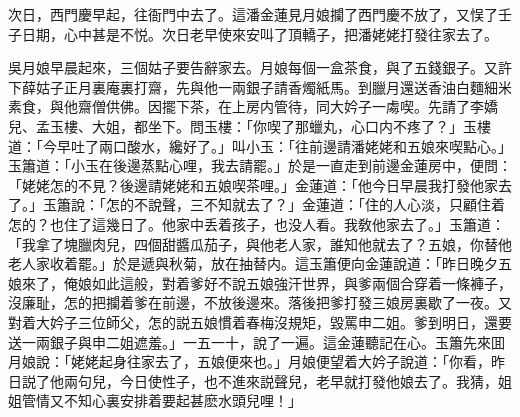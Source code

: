 次日，西門慶早起，往衙門中去了。這潘金蓮見月娘攔了西門慶不放了，又悮了壬子日期，心中甚是不悦。次日老早使來安叫了頂轎子，把潘姥姥打發往家去了。

吳月娘早晨起來，三個姑子要告辭家去。月娘每個一盒茶食，與了五錢銀子。又許下薛姑子正月裏庵裏打齋，先與他一兩銀子請香燭紙馬。到臘月還送香油白麵細米素食，與他齋僧供佛。因擺下茶，在上房内管待，同大妗子一䖏喫。先請了李嬌兒、孟玉樓、大姐，都坐下。問玉樓：「你喫了那蠟丸，心口内不疼了？」玉樓道：「今早吐了兩口酸水，纔好了。」叫小玉：「往前邊請潘姥姥和五娘來喫點心。」玉簫道：「小玉在後邊蒸點心哩，我去請罷。」於是一直走到前邊金蓮房中，便問：「姥姥怎的不見？後邊請姥姥和五娘喫茶哩。」金蓮道：「他今日早晨我打發他家去了。」玉簫說：「怎的不說聲，三不知就去了？」金蓮道：「住的人心淡，只顧住着怎的？也住了這幾日了。他家中丢着孩子，也没人看。我敎他家去了。」玉簫道：「我拿了塊臘肉兒，四個甜醬瓜茄子，與他老人家，誰知他就去了？五娘，你替他老人家收着罷。」於是遞與秋菊，放在抽替内。這玉簫便向金蓮說道：「昨日晚夕五娘來了，俺娘如此這般，對着爹好不說五娘強汗世界，與爹兩個合穿着一條褲子，沒廉耻，怎的把攔着爹在前邊，不放後邊來。落後把爹打發三娘房裏歇了一夜。又對着大妗子三位師父，怎的説五娘慣着春梅沒規矩，毀罵申二姐。爹到明日，還要送一兩銀子與申二姐遮羞。」一五一十，說了一遍。這金蓮聽記在心。玉簫先來囬月娘說：「姥姥起身往家去了，五娘便來也。」月娘便望着大妗子說道：「你看，昨日説了他兩句兒，今日使性子，也不進來説聲兒，老早就打發他娘去了。我猜，姐姐管情又不知心裏安排着要起甚麽水頭兒哩！」

